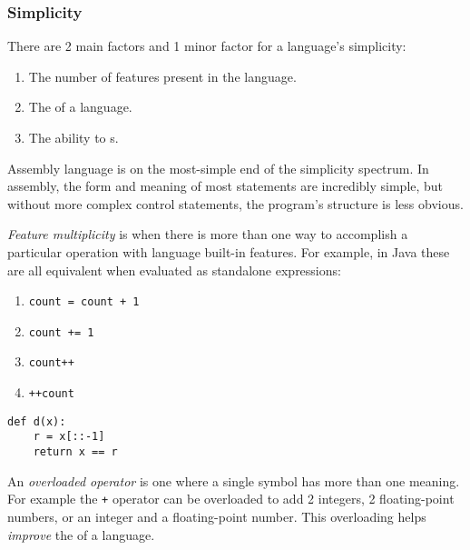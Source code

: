 \subsubsection{Simplicity}\label{subsubsec:Simplicity}
There are 2 main factors and 1 minor factor for a language's simplicity:
\begin{enumerate}[noitemsep]
\item The number of features present in the language.
\item The  of a language.
\item The ability to s.
\end{enumerate}

Assembly language is on the most-simple end of the simplicity spectrum.
In assembly, the form and meaning of most statements are incredibly simple, but without more complex control statements, the program's structure is less obvious.

\begin{definition}\label{def:Feature_Multiplicity}
  \emph{Feature multiplicity} is when there is more than one way to accomplish a particular operation with language built-in features.
  For example, in Java these are all equivalent when evaluated as standalone expressions:
  \begin{enumerate}[noitemsep]
  \item \texttt{count = count + 1}
  \item \texttt{count += 1}
  \item \texttt{count++}
  \item \texttt{++count}
  \end{enumerate}
\end{definition}

\begin{verbatim}
def d(x):
    r = x[::-1]
    return x == r
\end{verbatim}

\begin{definition}\label{def:Overload_Operator}
  An \emph{overloaded operator} is one where a single symbol has more than one meaning.
  For example the \texttt{+} operator can be overloaded to add 2 integers, 2 floating-point numbers, or an integer and a floating-point number.
  This overloading helps \emph{improve} the  of a language.
\end{definition}

